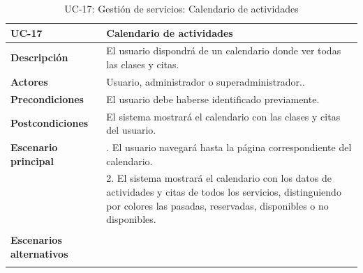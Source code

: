\begin{table}
  \begin{center}
    \begin{tabularx}{16.4cm}{|l|X|}
      \hline
      \textbf{UC-17} & \textbf{Calendario de actividades}\\
      \hline
      \textbf{Descripción} & El usuario dispondrá de un calendario donde ver todas las clases y citas. \\
      \hline
      \textbf{Actores} & Usuario, administrador o superadministrador..\\
      \hline
      \textbf{Precondiciones} & El usuario debe haberse identificado previamente.\\
      \hline
      \textbf{Postcondiciones} & El sistema mostrará el calendario con las clases y citas del usuario.\\
      \hline
      \textbf{Escenario principal} & \smallskip 1. El usuario navegará hasta la página correspondiente del calendario.\\
      & 2. El sistema mostrará el calendario con los datos de actividades y citas de todos los servicios, distinguiendo por colores las pasadas, reservadas, disponibles o no disponibles.\\
      & \\
      \hline
      \textbf{Escenarios alternativos} & \\
      & \\
      \hline
    \end{tabularx}
    \caption{UC-17: Gestión de servicios: Calendario de actividades}
    \label{tab:CU-calendario}
  \end{center}
\end{table}


